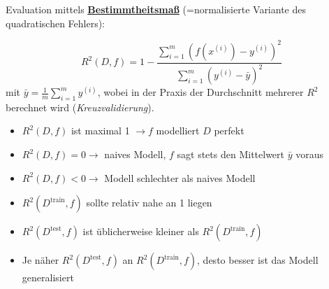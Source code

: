 Evaluation  mittels \textbf{\underline{Bestimmtheitsmaß}} (=normalisierte Variante des quadratischen Fehlers):

\begin{equation*}
    R^2(D,f) = 1 - \frac{\sum_{i=1}^{m}(f(x^{(i)}) - y^{(i)})^2}{\sum_{i=1}^{m}(y^{(i)} - \bar{y})^2}
\end{equation*} mit $\bar{y} = \frac{1}{m}\sum_{i=1}^{m}y^{(i)}$, wobei in der Praxis der Durchschnitt mehrerer $R^2$ berechnet wird (\emph{Kreuzvalidierung}).

\begin{itemize}
    \item $R^2(D,f)$  ist maximal 1 $\rightarrow f$ modelliert $D$ perfekt
    \item $R^2(D,f) = 0 \rightarrow$ naives Modell, $f$ sagt stets den Mittelwert $\bar{y}$ voraus
    \item $R^2(D,f) < 0 \rightarrow$ Modell schlechter als naives Modell
    \item $R^2(D^{\text{train}},f)$ sollte relativ nahe an 1 liegen
    \item $R^2(D^{\text{test}},f)$ ist üblicherweise kleiner als $R^2(D^{\text{train}},f)$
    \item Je näher $R^2(D^{\text{test}},f)$ an $R^2(D^{\text{train}},f)$, desto besser ist das Modell generalisiert
\end{itemize}


        
        
    
                    
                    
        
